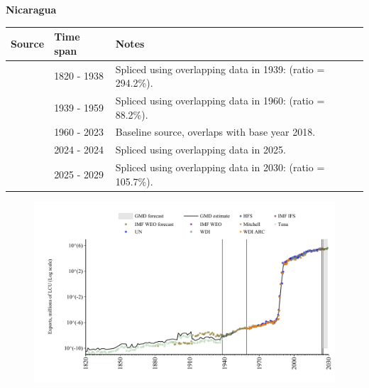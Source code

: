\documentclass[12pt,a4paper,landscape]{article}
\begin{document}
\begin{adjustbox}{max totalsize={\paperwidth}{\paperheight},center}
\begin{minipage}[t][\textheight][t]{\textwidth}
\vspace*{0.5cm}
{}
\begin{center}
{\Large\bfseries Nicaragua}
\end{center}
\vspace{0.5cm}
\begin{table}[H]
\centering
\small
\begin{tabular}{|l|l|l|}
\hline
\textbf{Source} & \textbf{Time span} & \textbf{Notes} \\
\hline
\rowcolor{white}\cite{Tena}& 1820 - 1938 &Spliced using overlapping data in 1939: (ratio = 294.2\%).\\
\rowcolor{lightgray}\cite{Mitchell}& 1939 - 1959 &Spliced using overlapping data in 1960: (ratio = 88.2\%).\\
\rowcolor{white}\cite{WDI}& 1960 - 2023 &Baseline source, overlaps with base year 2018.\\
\rowcolor{lightgray}\cite{IMF_IFS}& 2024 - 2024 &Spliced using overlapping data in 2025.\\
\rowcolor{white}\cite{IMF_WEO_forecast}& 2025 - 2029 &Spliced using overlapping data in 2030: (ratio = 105.7\%).\\
\hline
\end{tabular}
\end{table}
\begin{figure}[H]
\centering
\includegraphics[width=\textwidth,height=0.6\textheight,keepaspectratio]{graphs/NIC_exports.pdf}
\end{figure}
\end{minipage}
\end{adjustbox}
\end{document}
